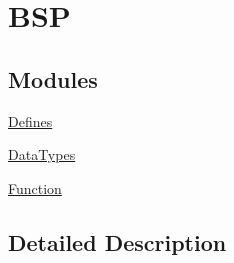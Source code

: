 \hypertarget{group__nm__bsp}{}\section{B\+SP}
\label{group__nm__bsp}
\subsection*{Modules}
\begin{DoxyCompactItemize}
\item 
\hyperlink{group__BSPDefine}{Defines}
\item 
\hyperlink{group__DataT}{Data\+Types}
\item 
\hyperlink{group__BSPAPI}{Function}
\end{DoxyCompactItemize}


\subsection{Detailed Description}

